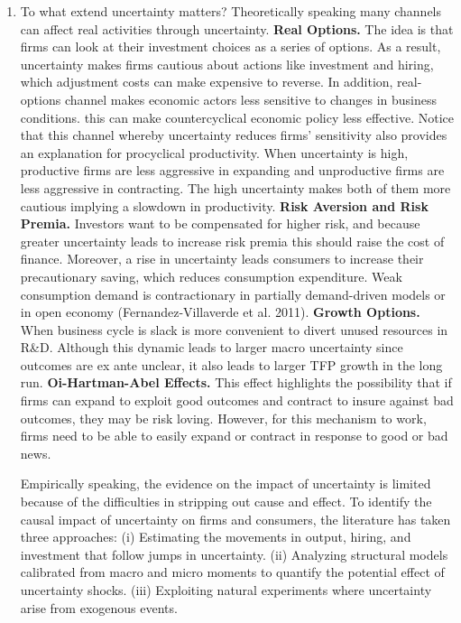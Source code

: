 \documentclass{article}
\begin{document}
{\begin{enumerate}
	\item To what extend uncertainty matters? Theoretically speaking many channels can affect real activities through uncertainty. \textbf{Real Options.} The idea is that firms can look at their investment choices as a series of options. As a result, uncertainty makes firms cautious about actions like investment and hiring, which adjustment costs can make expensive to reverse. In addition, real-options channel makes economic actors less sensitive to changes in business conditions. this can make countercyclical economic policy less effective. Notice that this channel whereby uncertainty reduces firms' sensitivity also provides an explanation for procyclical productivity. When uncertainty is high, productive firms are less aggressive in expanding and unproductive firms are less aggressive in contracting. The high uncertainty makes both of them more cautious implying a slowdown in productivity. \textbf{Risk Aversion and Risk Premia.} Investors want to be compensated for higher risk, and because greater uncertainty leads to increase risk premia this should raise the cost of finance. Moreover, a rise in uncertainty leads consumers to increase their precautionary saving, which reduces consumption expenditure. Weak consumption demand is contractionary in partially demand-driven models or in open economy (Fernandez-Villaverde et al. 2011). \textbf{Growth Options.} When business cycle is slack is more convenient to divert unused resources in R\&D. Although this dynamic leads to larger macro uncertainty since outcomes are ex ante unclear, it also leads to larger TFP growth in the long run. \textbf{Oi-Hartman-Abel Effects.} This effect highlights the possibility that if firms can expand to exploit good outcomes and contract to insure against bad outcomes, they may be risk loving. However, for this mechanism to work, firms need to be able to easily expand or contract in response to good or bad news. 
	
	Empirically speaking, the evidence on the impact of uncertainty is limited because of the difficulties in stripping out cause and effect. To identify the causal impact of uncertainty on firms and consumers, the literature has taken three approaches: (i) Estimating the movements in output, hiring, and investment that follow jumps in uncertainty. (ii) Analyzing structural models calibrated from macro and micro moments to quantify the potential effect of uncertainty shocks. (iii) Exploiting natural experiments where uncertainty arise from exogenous events. 
	

\end{enumerate}}
\end{document}
